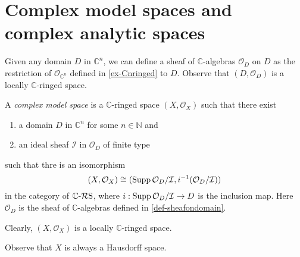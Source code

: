 \section{Complex model spaces and complex analytic spaces}



\begin{definition}\label{def-sheafondomain}
Given any domain $D$ in $\mathbb{C}^n$, we can define a sheaf of $\mathbb{C}$-algebras $\mathcal{O}_D$ on $D$ as the restriction of $\mathcal{O}_{\mathbb{C}^n}$ defined in \cref{ex-Cnringed} to $D$. Observe that $(D,\mathcal{O}_D)$ is a locally $\mathbb{C}$-ringed space. 
\end{definition}


\begin{definition}\label{def-complexmodelspace}
    A \emph{complex model space} is a $\mathbb{C}$-ringed space $(X,\mathcal{O}_X)$ such that there exist
    \begin{enumerate}
        \item a domain $D$ in $\mathbb{C}^n$ for some $n\in \mathbb{N}$ and
        \item an ideal sheaf $\mathcal{I}$ in $\mathcal{O}_D$ of finite type
    \end{enumerate}
    such that thre is an isomorphism
    \[
        (X,\mathcal{O}_X)\cong (\operatorname{Supp} \mathcal{O}_D/\mathcal{I},i^{-1}(\mathcal{O}_D/\mathcal{I}))
    \]
    in the category of $\mathbb{C}\text{-}\mathcal{R}\mathrm{S}$, where $i:\operatorname{Supp} \mathcal{O}_D/\mathcal{I}\rightarrow D$ is the inclusion map. Here $\mathcal{O}_D$ is the sheaf of $\mathbb{C}$-algebras defined in \cref{def-sheafondomain}.

    Clearly, $(X,\mathcal{O}_X)$ is a locally $\mathbb{C}$-ringed space.
\end{definition}
Observe that $X$ is always a Hausdorff space.

